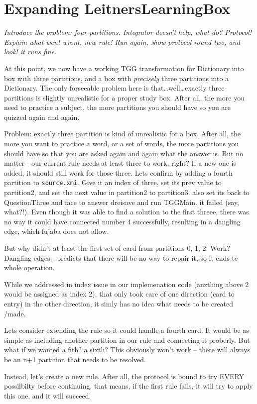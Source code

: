 \newpage
\section{Expanding LeitnersLearningBox}
\genHeader

\emph{Introduce the problem: four partitions. Integrator doesn't help, what do? Protocol! Explain what went wront, new rule! Run again, show protocol round
two, and look! it runs fine.}

At this point, we now have a working TGG transformation for Dictionary into box with three partitions, and a box with \emph{precisely} three partitions into a
Dictionary. The only forseeable problem here is that\ldots well\ldots exactly three partitions is slightly unrealistic for a proper study box. After all, the
more you need to practice a subject, the more partitions you should have so you are quizzed again and again.

Problem: exactly three partition is kind of unrealistic for a box. After all, the more you want to practice a word, or a set of words, the more partitions you
should have so that you are asked again and again what the answer is. But no matter - our current rule needs at least three to work, right? If a new one is
added, it should still work for those three. Lets confirm by adding a fourth partition to \texttt{source.xmi}. Give it an index of three, set its prev value to
partition2, and set the next value in partition2 to partition3. also set its back to QuestionThree and face to answer dreisave and run TGGMain. it failed (say,
what?!). Even though it was able to find a solution to the first threee, there was no way it could have connected number 4 successfully, resulting in a dangling
edge, which fujaba does not allow.

But why didn't at least the first set of card from partitions 0, 1, 2. Work? Dangling edges - predicts that there will be no way to repair it, so it ends te
whole operation.

While we addressed in index issue in our implemenation code (anzthing above 2 would be assigned as index 2), that only took care of one direction (card to
entry) in the other direction, it simly has no idea what needs to be created /made. 

Lets consider extending the rule so it could handle a fourth card. It would be as simple as including another partition in our rule and connecting it proberly.
But what if we wanted a fith? a sixth?  This obviously won't work -- there will always be an n+1 partition that needs to be resolved.

Instead, let's create a new rule. After all, the protocol is bound to try EVERY possilbilty before continuing. that means, if the first rule fails, it will try
to apply this one, and it will succeed.







